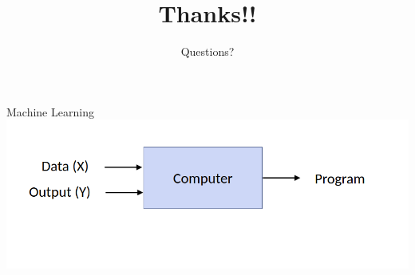 \documentclass[aspectratio=169,14pt]{beamer}
\begin{document}
\begin{frame}{Machine Learning}
\includegraphics[width=\textwidth,height=0.65\textheight]{Images/demystifying_ML1.png}
\end{frame}

{\1
\begin{frame}
	\title{Thanks!!}
	\subtitle{Questions?}
	\titlepage
\end{frame}
}



\end{document}
